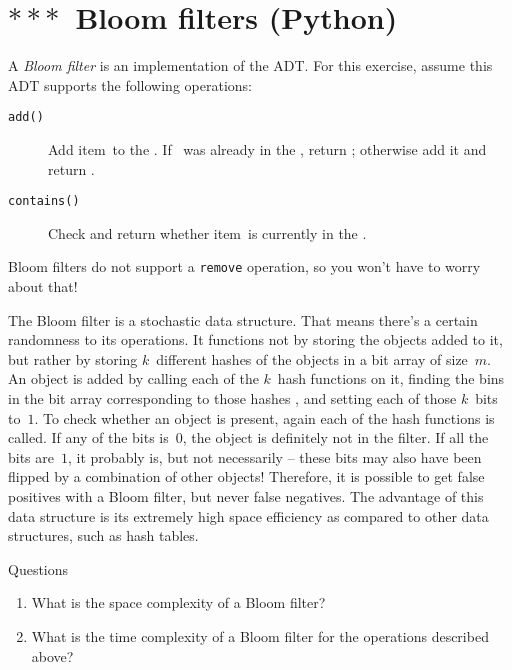 \documentclass[12pt]{article}
\begin{document}
\clearpage
\section{$\ast\ast\ast$~Bloom filters (Python)}

A \emph{Bloom filter} is an implementation of the \Set ADT. For this exercise, assume this ADT supports the following operations:
%
\begin{description}
    \item[\texttt{add(\x)}] Add item~\x to the \Set. If \x~was already in the \Set, return \false; otherwise add it and return \true.
    \item[\texttt{contains(\x)}] Check and return whether item~\x is currently in the \Set.
\end{description}
%
Bloom filters do not support a \texttt{remove} operation, so you won't have to worry about that!

The Bloom filter is a stochastic data structure. That means there's a certain randomness to its operations. It functions not by storing the objects added to it, but rather by storing $k$~different hashes of the objects in a bit array of size~$m$. An object is added by calling each of the $k$~hash functions on it, finding the bins in the bit array corresponding to those hashes , and setting each of those $k$~bits to~$1$. To check whether an object is present, again each of the hash functions is called. If any of the bits is~$0$, the object is definitely not in the filter. If all the bits are~$1$, it probably is, but not necessarily -- these bits may also have been flipped by a combination of other objects! Therefore, it is possible to get false positives with a Bloom filter, but never false negatives. The advantage of this data structure is its extremely high space efficiency as compared to other data structures, such as hash tables.
%
\begin{mybox}{Questions}
    \begin{enumerate}
        \item What is the space complexity of a Bloom filter?
        \item What is the time complexity of a Bloom filter for the operations described above?
    \end{enumerate}
\end{mybox}
\end{document}

